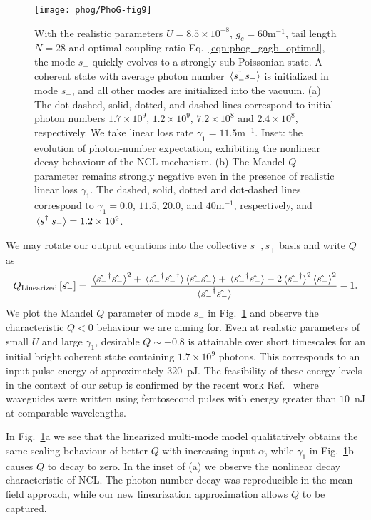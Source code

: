 \begin{figure}[htp]
\captionsetup{width=0.8\linewidth}
\centering
\texttt{[image: phog/PhoG-fig9]}
\caption{\label{fig:phog_multimode_linearized} With the realistic parameters $U = 8.5 \times 10^{-8}$, $g_c = 60$m$^{-1}$, tail length $N = 28$ and optimal coupling ratio Eq.~\ref{eqn:phog_gagb_optimal}, the mode $s_-$ quickly evolves to a strongly sub-Poissonian state. A coherent state with average photon number $\ev*{s_-^\dagger s_-}$ is initialized in mode $s_-$, and all other modes are initialized into the vacuum. (a) The dot-dashed, solid, dotted, and dashed lines correspond to initial photon numbers $1.7\times 10^9$, $1.2\times 10^9$, $7.2\times 10^8$ and $2.4\times 10^8$, respectively. We take linear loss rate $\gamma_1 = 11.5$m$^{-1}$. Inset: the evolution of photon-number expectation, exhibiting the nonlinear decay behaviour of the NCL mechanism. (b) The Mandel $Q$ parameter remains strongly negative even in the presence of realistic linear loss $\gamma_1$. The dashed, solid, dotted and dot-dashed lines correspond to $\gamma_1 = 0.0$, $11.5$, $20.0$, and $40$m$^{-1}$, respectively, and $\ev*{s_-^\dagger s_-} = 1.2\times 10^9$.}
\end{figure}


We may rotate our output equations into the collective $s_-, s_+$ basis and write $Q$ as 
\begin{equation}
Q_{\text{Linearized}}\left[\hat{s_-}\right] = \frac{\ev*{\hat{s_-}^\dagger \hat{s_-}}^2 + \ev*{\hat{s_-}^\dagger\hat{s_-}^\dagger} \ev{\hat{s_-}\hat{s_-}} + \ev*{\hat{s_-}^\dagger \hat{s_-}} - 2 \ev*{\hat{s_-}^\dagger}^2 \ev{\hat{s_-}}^2}{\ev*{\hat{s_-}^\dagger \hat{s_-}}} - 1.
\end{equation}
We plot the Mandel $Q$ parameter of mode $s_-$ in Fig.~\ref{fig:phog_multimode_linearized} and observe the characteristic $Q<0$ behaviour we are aiming for. Even at realistic parameters of small $U$ and large $\gamma_1$, desirable $Q \sim -0.8$ is attainable over short timescales for an initial bright coherent state containing $1.7\times 10^9$ photons. This corresponds to an input pulse energy of approximately $320$~pJ. The feasibility of these energy levels in the context of our setup is confirmed by the recent work Ref.~\cite{Butcher2018} where waveguides were written using femtosecond pulses with energy greater than $10$~nJ at comparable wavelengths.

In Fig.~\ref{fig:phog_multimode_linearized}a we see that the linearized multi-mode model qualitatively obtains the same scaling behaviour of better $Q$ with increasing input $\alpha$, while $\gamma_1$ in Fig.~\ref{fig:phog_multimode_linearized}b causes $Q$ to decay to zero. In the inset of (a) we observe the nonlinear decay characteristic of NCL. The photon-number decay was reproducible in the mean-field approach, while our new linearization approximation allows $Q$ to be captured.



